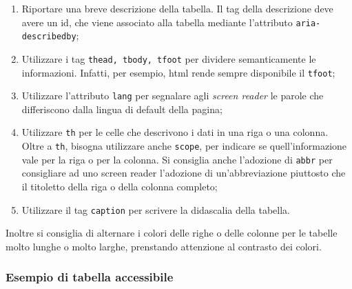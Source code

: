 \documentclass[12pt]{article}
\begin{document}
\begin{enumerate}
	\item Riportare una breve descrizione della tabella. Il tag della
	      descrizione deve avere un id, che viene associato alla tabella mediante
	      l'attributo \lstinline{aria-describedby};

	\item Utilizzare i tag \lstinline{thead, tbody, tfoot} per dividere
	      semanticamente le informazioni. Infatti, per esempio, html rende sempre
	      disponibile il \lstinline{tfoot};

	\item Utilizzare l'attributo \lstinline{lang} per segnalare agli
	      \textit{screen reader} le parole che differiscono dalla lingua di
	      default della pagina;

	\item Utilizzare \lstinline{th} per le celle che descrivono i dati in una
	      riga o una colonna. Oltre a \lstinline{th}, bisogna utilizzare anche
	      \lstinline{scope}, per indicare se quell'informazione vale per la riga
	      o per la colonna. Si consiglia anche l'adozione di \lstinline{abbr}
	      per consigliare ad uno screen reader l'adozione di un'abbreviazione
	      piuttosto che il titoletto della riga o della colonna completo;

	\item Utilizzare il tag \lstinline{caption} per scrivere la didascalia
	      della tabella.
\end{enumerate}

Inoltre si consiglia di alternare i colori delle righe o delle colonne per le
tabelle molto lunghe o molto larghe, prenstando attenzione al contrasto dei
colori.

\subsubsection{Esempio di tabella accessibile}
\end{document}
